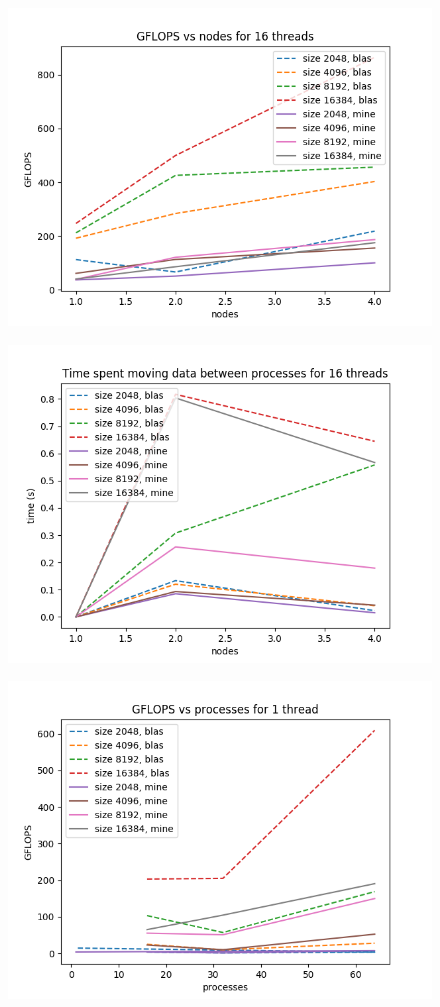 \documentclass{article}
\begin{document}
\begin{figure}[h!]
    \centering
    \includegraphics[width=0.8\linewidth]{gflops_nodes_16_threads.png}
\end{figure}

\begin{figure}[h!]
    \centering
    \includegraphics[width=0.8\linewidth]{time_nodes_16_threads.png}
\end{figure}


\begin{figure}[h!]
    \centering
    \includegraphics[width=0.8\linewidth]{gflops_processes_1_thread.png}
\end{figure}
\end{document}
